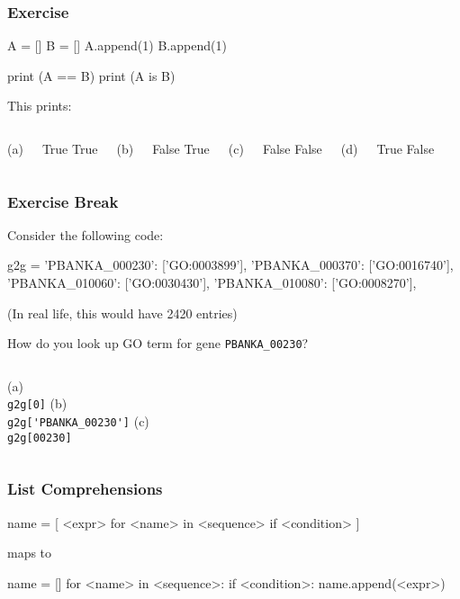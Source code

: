 \begin{frame}[fragile]
\frametitle{Exercise}
\begin{python}
A = []
B = []
A.append(1)
B.append(1)

print (A == B)
print (A is B)
\end{python}

This prints:
\begin{columns}
(a)
\begin{python}
True
True
\end{python}
(b)
\begin{python}
False
True
\end{python}
(c)
\begin{python}
False
False
\end{python}
(d)
\begin{python}
True
False
\end{python}
\end{columns}
\end{frame}

\begin{frame}[fragile]
\frametitle{Exercise Break}
Consider the following code:
\begin{python}
g2g = {
    'PBANKA_000230': ['GO:0003899'],
    'PBANKA_000370': ['GO:0016740'],
    'PBANKA_010060': ['GO:0030430'],
    'PBANKA_010080': ['GO:0008270'],
}
\end{python}
(In real life, this would have 2420 entries)

\pause
How do you look up GO term for gene \lstinline{PBANKA_00230}?

\pause
\bigskip
\begin{columns}
(a)\\
\lstinline{g2g[0]}
(b)\\
\lstinline{g2g['PBANKA_00230']}
(c)\\
\lstinline{g2g[00230]}

\end{columns}

\end{frame}

\begin{frame}[fragile]
\frametitle{List Comprehensions}

\begin{python}
name = [ <expr> for <name> in <sequence> if <condition> ]
\end{python}

maps to

\begin{python}
name = []
for <name> in <sequence>:
    if <condition>:
        name.append(<expr>)
\end{python}

\end{frame}

